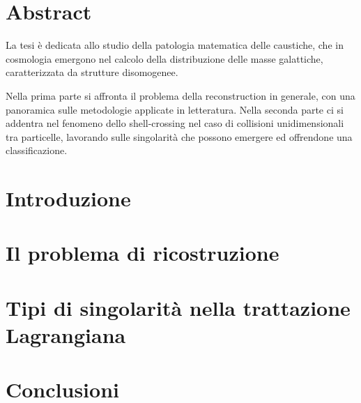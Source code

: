 \documentclass[a4paper,11pt,oneside]{book}
\begin{document}
    

    \mainmatter

    \clearpage %
    \begingroup
    \pagestyle{empty}
    \null
    \newpage
    \endgroup
    
	    
    \chapter*{Abstract}
    La tesi è dedicata allo studio della patologia matematica delle caustiche, che in cosmologia emergono
    nel calcolo della distribuzione delle masse galattiche, caratterizzata da strutture disomogenee.

    Nella prima parte si affronta il problema della reconstruction in generale, con una panoramica sulle 
    metodologie applicate in letteratura. Nella seconda parte ci si addentra nel fenomeno dello 
    shell-crossing nel caso di collisioni unidimensionali tra particelle, lavorando sulle singolarità
    che possono emergere ed offrendone una classificazione.
    


    \tableofcontents

    \chapter*{Introduzione}
    

    \chapter{Il problema di ricostruzione}
    


    \chapter{Tipi di singolarità nella trattazione Lagrangiana}
    


    \chapter*{Conclusioni}

    

    \nocite{*}

    \printbibliography
    
\end{document}
